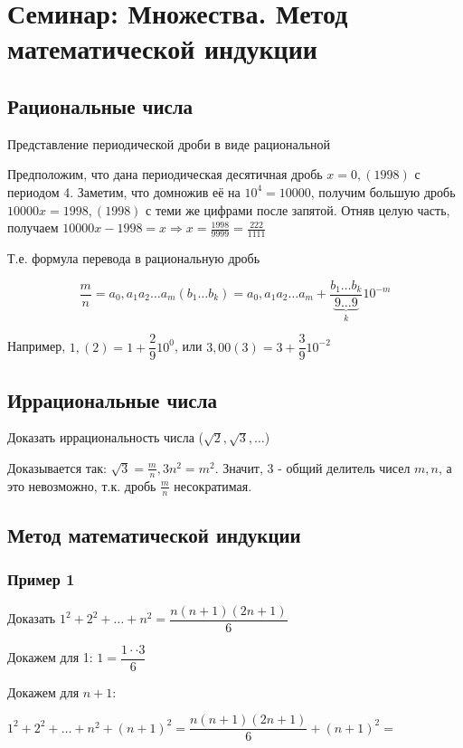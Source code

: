 \section{Семинар: Множества. Метод математической индукции}

\subsection{Рациональные числа}

Представление периодической дроби в виде рациональной

Предположим, что дана периодическая десятичная дробь $x=0,(1998)$ с периодом 4. Заметим, что домножив её на $10^4 = 10000$, получим большую дробь $10000x=1998,(1998)$ с теми же цифрами после запятой. Отняв целую часть, получаем $10000x-1998=x \Rightarrow x=\frac{1998}{9999}=\frac{222}{1111}$

Т.е.  формула перевода в рациональную дробь

$$
\dfrac{m}{n} = a_0,a_1 a_2 \ldots a_m (b_1 \ldots b_k) 
= a_0,a_1 a_2 \ldots a_m + \dfrac{b_1 \ldots b_k}{ \underbrace{9 \ldots 9}_{k} }10^{-m}
$$

Например, $1,(2) = 1 + \dfrac{2}{9} 10^0$, или $3,00(3) = 3 + \dfrac{3}{9}10^{-2}$

\subsection{Иррациональные числа}

Доказать иррациональность числа ($ \sqrt{2}, \sqrt{3}, \ldots $)

Доказывается так: $\sqrt{3} = \frac{m}{n}, 3n^2 = m^2$. Значит, 3 - общий делитель чисел $m, n $, а это невозможно, т.к. дробь $ \frac{m}{n} $ несократимая.

\subsection{Метод математической индукции}

\subsubsection{Пример 1}


Доказать
$1^2 + 2^2 + \ldots + n^2 = \dfrac{n(n+1)(2n+1)}{6}$

Докажем для 1: $1 = \dfrac{1\cdot\cdot3}{6}$

Докажем для $n+1$:

$1^2 + 2^2 + \ldots + n^2 + (n+1)^2 = \dfrac{n(n+1)(2n+1)}{6} + (n+1)^2 = $

